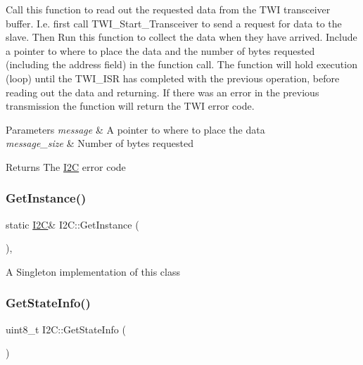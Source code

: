 Call this function to read out the requested data from the T\+WI transceiver buffer. I.\+e. first call T\+W\+I\+\_\+\+Start\+\_\+\+Transceiver to send a request for data to the slave. Then Run this function to collect the data when they have arrived. Include a pointer to where to place the data and the number of bytes requested (including the address field) in the function call. The function will hold execution (loop) until the T\+W\+I\+\_\+\+I\+SR has completed with the previous operation, before reading out the data and returning. If there was an error in the previous transmission the function will return the T\+WI error code. 
\begin{DoxyParams}{Parameters}
{\em message} & A pointer to where to place the data \\
\hline
{\em message\+\_\+size} & Number of bytes requested \\
\hline
\end{DoxyParams}
\begin{DoxyReturn}{Returns}
The \hyperlink{class_i2_c}{I2C} error code 
\end{DoxyReturn}
\hypertarget{class_i2_c_ade3b5d971432c82867201123965cf3fd}{}\label{class_i2_c_ade3b5d971432c82867201123965cf3fd} 
\subsubsection{\texorpdfstring{Get\+Instance()}{GetInstance()}}
{\footnotesize\ttfamily static \hyperlink{class_i2_c}{I2C}\& I2\+C\+::\+Get\+Instance (\begin{DoxyParamCaption}{ }\end{DoxyParamCaption})\hspace{0.3cm}{\ttfamily [inline]}, {\ttfamily [static]}}

A Singleton implementation of this class \hypertarget{class_i2_c_ac46dd0197fdfbea2ff6d24b45f2ec67b}{}\label{class_i2_c_ac46dd0197fdfbea2ff6d24b45f2ec67b} 
\subsubsection{\texorpdfstring{Get\+State\+Info()}{GetStateInfo()}}
{\footnotesize\ttfamily uint8\+\_\+t I2\+C\+::\+Get\+State\+Info (\begin{DoxyParamCaption}{ }\end{DoxyParamCaption})}

